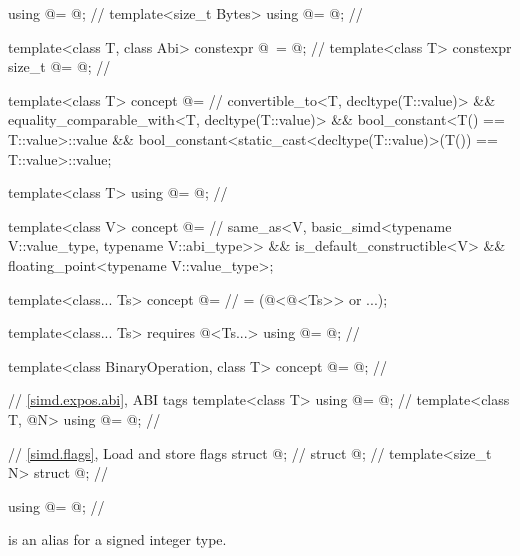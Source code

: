 \begin{codeblock}
using @\simdsizetype@ = @\seebelow@;                                 // \expos
template<size_t Bytes> using @\integerfrom@ = @\seebelow@;            // \expos

template<class T, class Abi>
  constexpr @\simdsizetype\ \simdsizev@ = @\seebelow@;               // \expos
template<class T> constexpr size_t @\maskelementsize@ = @\seebelow@; // \expos

template<class T>
  concept @\constexprwrapperlike@ =                                // \expos
    convertible_to<T, decltype(T::value)> &&
    equality_comparable_with<T, decltype(T::value)> &&
    bool_constant<T() == T::value>::value &&
    bool_constant<static_cast<decltype(T::value)>(T()) == T::value>::value;

template<class T> using @\deducedsimd@ = @\seebelow@;               // \expos

template<class V>
  concept @\simdfloatingpoint@ =                                   // \expos
    same_as<V, basic_simd<typename V::value_type, typename V::abi_type>> &&
    is_default_constructible<V> && floating_point<typename V::value_type>;

template<class... Ts>
  concept @\mathfloatingpoint@ =                                   // \expos
    = (@\simdfloatingpoint@<@\deducedsimd@<Ts>> or ...);

template<class... Ts>
  requires @\mathfloatingpoint@<Ts...>
    using @\mathcommonsimd@ = @\seebelow@;                         // \expos

template<class BinaryOperation, class T>
  concept @\reductionoperation@ = @\seebelow@;                     // \expos

// \ref{simd.expos.abi},  ABI tags
template<class T> using @\nativeabi@ = @\seebelow@;                   // \expos
template<class T, @\simdsizetype@ N> using @\deducet@ = @\seebelow@;   // \expos

// \ref{simd.flags}, Load and store flags
struct @\convertflag@;                                              // \expos
struct @\alignedflag@;                                              // \expos
template<size_t N> struct @\overalignedflag@;                       // \expos
\end{codeblock}

\begin{itemdecl}
using @\simdsizetype@ = @\seebelow@; // \expos
\end{itemdecl}
\begin{itemdescr}
  \pnum
  \simdsizetype{} is an alias for a signed integer type.
\end{itemdescr}

